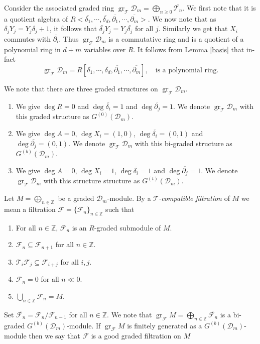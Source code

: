 \documentclass{amsart}
\newcommand{\ZZ}{\mathbb{Z} }
\newcommand{\D}{\mathcal{D} }
\newcommand{\T}{\mathcal{T} }
\newcommand{\F}{\mathcal{F} }
\newcommand{\ov}{\overline}
\newcommand{\gr}{\operatorname{gr}}
\theoremstyle{plain}
\theoremstyle{definition}
\theoremstyle{remark}
\begin{document}
 \s Consider the associated graded ring $\gr_\T \D_m = \bigoplus_{n \geq 0} \ov{\T_n}$. We first note that
 it is a quotient algebra of $R<\ov{\delta_1}, \cdots, \ov{\delta_d}, \ov{\partial_1},\cdots, \ov{\partial_m}>$.
 We now note that as $\delta_j Y_j = Y_j \delta_j + 1$, it follows that $\ov{\delta_j} Y_j = Y_j \ov{\delta_j}$ for all $j$.
 Similarly we get that $X_i$ commutes with $\ov{\partial_i}$. Thus $\gr_\T \D_m$ is a commutative ring and is a quotient
 of a polynomial ring in $d+m$ variables over $R$. It follows from Lemma \ref{basis} that in-fact 
 $$\gr_\T \D_m = R[\ov{\delta_1}, \cdots, \ov{\delta_d}, \ov{\partial_1},\cdots, \ov{\partial_m}], \quad \text{is a polynomial ring}.$$

 \s \label{bi-single-grading}
We note that there are  three graded structures on $\gr_\T \D_m$.
\begin{enumerate}
 \item We give $\deg R = 0$ and $\deg \ov{\delta_i} = 1$ and $\deg \ov{\partial_j} = 1$. We denote $\gr_\T \D_m$ with this graded
 structure as $G^{(0)}(\D_m)$.
 \item
 We give $\deg A = 0$, $\deg X_i = (1,0)$, $\deg \ov{\delta_i} = (0,1)$ and $\deg \ov{\partial_j} = (0,1)$.
 We denote $\gr_\T \D_m$ with this bi-graded
 structure as $G^{(b)}(\D_m)$.
 \item
 We give $\deg A = 0$, $\deg X_i = 1$, $\deg \ov{\delta_i} = 1$ and $\deg \ov{\partial_j} = 1$.
 We denote $\gr_\T \D_m$ with this structure
 structure as $G^{(t)}(\D_m)$.
\end{enumerate}

 \s
Let $M = \bigoplus_{n \in \ZZ}$ be a graded $\D_m$-module. By a \textit{$\T$-compatible filtration} of $M$ we mean a filtration
$\F = \{ \F_n \}_{n \in \ZZ}$ such that
\begin{enumerate}
 \item For all $n \in \ZZ$,   $\F_n$ is an $R$-graded submodule of $M$.
 \item
 $\F_n \subseteq \F_{n+1}$ for all $n \in \ZZ$.
 \item
 $\T_i \F_j \subseteq \F_{i+j}$ for all $i, j$.
 \item
 $\F_n = 0$ for all $n \ll 0$.
 \item
 $\bigcup_{n \in \ZZ} \F_n = M$.
\end{enumerate}
Set $\ov{\F_n} = \F_n/\F_{n-1}$ for all $n \in \ZZ$.
We note that $\gr_\F M = \bigoplus_{n \in \ZZ} \ov{\F_n}$ is a bi-graded $G^{(b)}(\D_m)$-module.
If $\gr_\F M$ is finitely generated as a $G^{(b)}(\D_m)$-module then we say that $\F$ is a good graded filtration on $M$
\end{document}
